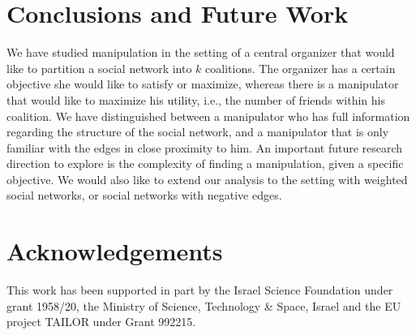 \documentclass{article}
\begin{document}




\section{Conclusions and Future Work}
We have studied manipulation in the setting of a central organizer that would like to partition a social network into $k$ coalitions. 
The organizer has a certain objective she would like to satisfy or maximize, whereas there is a manipulator that would like to maximize his utility, i.e., the number of friends within his coalition.
We have distinguished between a manipulator who has full information regarding the structure of the social network, and a manipulator that is only familiar with the edges in close proximity to him. 
An important future research direction to explore is the complexity of finding a manipulation, given a specific objective. We would also like to extend our analysis to the setting with weighted social networks, or social networks with negative edges.




\section*{Acknowledgements}
This work has been supported in part by the Israel Science
Foundation under grant 1958/20, the Ministry of Science, Technology \& Space, Israel and the EU project TAILOR under
Grant 992215.



\end{document}

